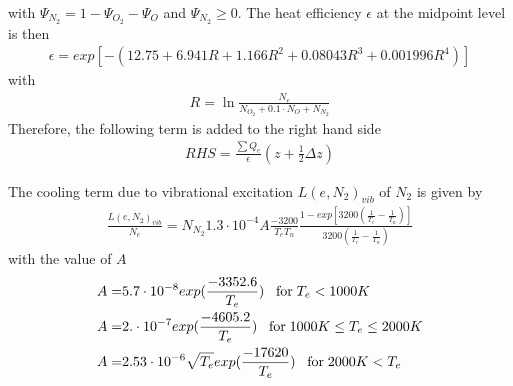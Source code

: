 %
with $\Psi_{N_2} = 1 - \Psi_{O_2} - \Psi_{O}$ and $\Psi_{N_2} \geq 0$.
The heat efficiency $\epsilon$ at the midpoint level is then
%
\begin{align}
 \epsilon = exp \left[ - \left( 12.75 + 6.941 R + 1.166 R^2 + 0.08043 R^3 + 0.001996 R^4 \right)\right]
\end{align}
%
with
%
\begin{align}
  R = \ln{\frac{N_e}{N_{O_2} + 0.1 \cdot N_{O}+ N_{N_2}}}
\end{align}
%
Therefore, the following term is added to  the right hand side
%
\begin{align}
  RHS = \frac{\sum Q_e}{\epsilon}(z + \frac{1}{2} \Delta z)
\end{align}
%

The cooling term due to vibrational excitation $L(e,N_2)_{vib}$
of $N_2$ is given by
%
\begin{align}
  \frac{L(e,N_2)_{vib}}{N_e } = N_{N_2} 1.3 \cdot 10^{-4} A
      \frac{-3200}{T_e T_n} \frac{1 - exp\left[ 3200 \left(
          \frac{1}{T_e}-\frac{1}{T_n}\right)\right]}{3200 \left(
          \frac{1}{T_e}-\frac{1}{T_n}\right)}
\end{align}
%
with the value of $A$
%
\begin{align}
   A = & 5.7 \cdot 10^{-8} exp(\frac{-3352.6}{T_e}) \; \; \; \text{for} \; T_e < 1000 K \notag \\
   A = & 2. \cdot 10^{-7} exp(\frac{-4605.2}{T_e}) \; \; \; \text{for} \; 1000 K \leq T_e \leq 2000 K \notag \\
   A = & 2.53 \cdot 10^{-6}\sqrt{T_e} exp(\frac{-17620}{T_e}) \; \; \; \text{for} \; 2000 K < T_e \notag
\end{align}
%

